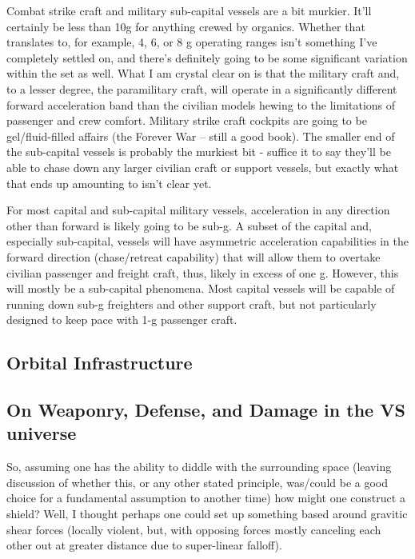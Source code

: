 Combat strike craft and military sub-capital vessels are a bit
murkier. It'll certainly be less than 10g for anything crewed by
organics. Whether that translates to, for example, 4, 6, or 8 g
operating ranges isn't something I've completely settled on, and
there's definitely going to be some significant variation within the
set as well. What I am crystal clear on is that the military craft
and, to a lesser degree, the paramilitary craft, will operate in a
significantly different forward acceleration band than the civilian
models hewing to the limitations of passenger and crew
comfort. Military strike craft cockpits are going to be
gel/fluid-filled affairs (the Forever War -- still a good book). The
smaller end of the sub-capital vessels is probably the murkiest bit -
suffice it to say they'll be able to chase down any larger civilian
craft or support vessels, but exactly what that ends up amounting to
isn't clear yet.

For most capital and sub-capital military vessels, acceleration in any
direction other than forward is likely going to be sub-g. A subset of
the capital and, especially sub-capital, vessels will have asymmetric
acceleration capabilities in the forward direction (chase/retreat
capability) that will allow them to overtake civilian passenger and
freight craft, thus, likely in excess of one g. However, this will
mostly be a sub-capital phenomena. Most capital vessels will be
capable of running down sub-g freighters and other support craft, but
not particularly designed to keep pace with 1-g passenger craft.

\subsection{Orbital Infrastructure}

\subsection{On Weaponry, Defense, and Damage in the VS universe}

So, assuming one has the ability to diddle with the surrounding space
(leaving discussion of whether this, or any other stated principle,
was/could be a good choice for a fundamental assumption to another
time) how might one construct a shield?  Well, I thought perhaps one
could set up something based around gravitic shear forces (locally
violent, but, with opposing forces mostly canceling each other out at
greater distance due to super-linear falloff).

